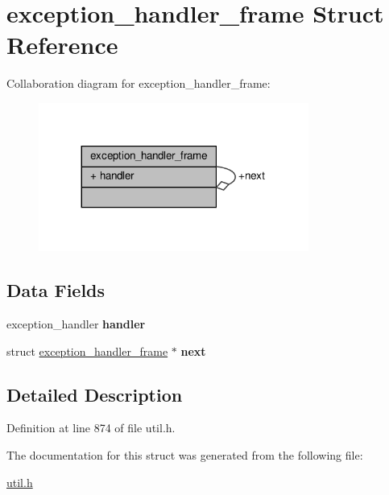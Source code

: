 \hypertarget{structexception__handler__frame}{}\section{exception\+\_\+handler\+\_\+frame Struct Reference}
\label{structexception__handler__frame}


Collaboration diagram for exception\+\_\+handler\+\_\+frame\+:\nopagebreak
\begin{figure}[H]
\begin{center}
\leavevmode
\includegraphics[width=251pt]{structexception__handler__frame__coll__graph}
\end{center}
\end{figure}
\subsection*{Data Fields}
\begin{DoxyCompactItemize}
\item 
\mbox{\label{structexception__handler__frame_a9df815cc8cec8aace242043b89fb44e8}} 
exception\+\_\+handler {\bfseries handler}
\item 
\mbox{\label{structexception__handler__frame_a407cf31d00d01b49b1774dea464c29cf}} 
struct \hyperlink{structexception__handler__frame}{exception\+\_\+handler\+\_\+frame} $\ast$ {\bfseries next}
\end{DoxyCompactItemize}


\subsection{Detailed Description}


Definition at line 874 of file util.\+h.



The documentation for this struct was generated from the following file\+:\begin{DoxyCompactItemize}
\item 
\hyperlink{util_8h}{util.\+h}\end{DoxyCompactItemize}
